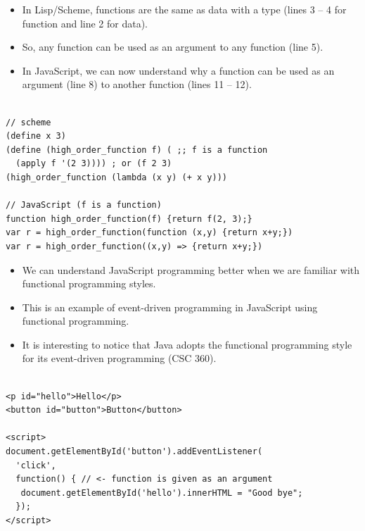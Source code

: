 \begin{frame}[fragile]{}

\begin{itemize}
	\item In Lisp/Scheme, functions are the same as data with a type (lines 3 -- 4 for function and line 2 for data). 
	\item So, any function can be used as an argument to any function (line 5). 
	\item In JavaScript, we can now understand why a function can be used as an argument (line 8) to another function (lines 11 -- 12).
\end{itemize}

\begin{Code}{}%
\begin{lstlisting}[firstnumber=1, label=glabels, xleftmargin=0pt, basicstyle=\scriptsize]% 

// scheme
(define x 3)
(define (high_order_function f) ( ;; f is a function
  (apply f '(2 3)))) ; or (f 2 3)
(high_order_function (lambda (x y) (+ x y)))

// JavaScript (f is a function)
function high_order_function(f) {return f(2, 3);}
var r = high_order_function(function (x,y) {return x+y;})
var r = high_order_function((x,y) => {return x+y;})
\end{lstlisting}%
\end{Code}%

\end{frame}

\begin{frame}[fragile]{}
\begin{itemize}
    \item We can understand JavaScript programming better when we are familiar with functional programming styles. 
	\item This is an example of event-driven programming in JavaScript using functional programming.
	\item It is interesting to notice that Java adopts the functional programming style for its event-driven programming (CSC 360).  
\end{itemize}

\begin{Code}{}%
\begin{lstlisting}[firstnumber=1, label=glabels, xleftmargin=0pt, basicstyle=\tiny]% 

<p id="hello">Hello</p>
<button id="button">Button</button>

<script>
document.getElementById('button').addEventListener(
  'click', 
  function() { // <- function is given as an argument
   document.getElementById('hello').innerHTML = "Good bye";
  });
</script>
\end{lstlisting}%
\end{Code}%
\end{frame}

